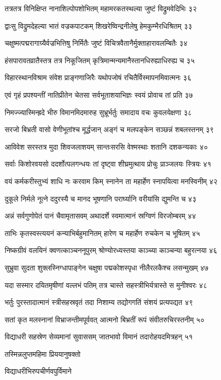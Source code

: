 तत्रतत्र विनिक्षिप्त नानाशिल्पोपशोभितम्
महामरकतस्थल्या जुष्टं विद्रुमवेदिभिः ३२

द्वाःसु विद्रुमदेहल्या भातं वज्रकपाटकम्
शिखरेष्विन्द्रनीलेषु हेमकुम्भैरधिश्रितम् ३३

चक्षुष्मत्पद्मरागाग्र्यैर्वज्रभित्तिषु निर्मितैः
जुष्टं विचित्रवैतानैर्मुक्ताहारावलम्बितैः ३४

हंसपारावतव्रातैस्तत्र तत्र निकूजितम्
कृत्रिमान्मन्यमानैस्तानधिरुह्याधिरुह्य च ३५

विहारस्थानविश्राम संवेश प्राङ्गणाजिरैः
यथोपजोषं रचितैर्विस्मापनमिवात्मनः ३६

एवं गृहं प्रपश्यन्तीं नातिप्रीतेन चेतसा
सर्वभूताशयाभिज्ञः स्वयं प्रोवाच तां प्रति ३७

निमज्ज्यास्मिन्ह्रदे भीरु विमानमिदमारुह
सुभ्रूर्भर्तुः समादाय वचः कुवलयेक्षणा ३८

सरजो बिभ्रती वासो वेणीभूतांश्च मूर्द्धजान्
अङ्गं च मलपङ्केन सञ्छन्नं शबलस्तनम् ३९

आविवेश सरस्तत्र मुदा शिवजलाशयम्
सान्तःसरसि वेश्मस्थाः शतानि दशकन्यकाः ४०

सर्वाः किशोरवयसो ददर्शोत्पलगन्धयः
तां दृष्ट्वा शीघ्रमुत्थाय प्रोचुः प्राञ्जलयः स्त्रियः ४१

वयं कर्मकरीस्तुभ्यं शाधि नः करवाम किम्
स्नानेन ता महार्हेण स्नापयित्वा मनस्विनीम् ४२

दुकूले निर्मले नूत्ने ददुरस्यै च मानद
भूषणानि परार्घ्यानि वरीयांसि द्युमन्ति च ४३

अन्नं सर्वगुणोपेतं पानं चैवामृतासवम्
अथादर्शे स्वमात्मानं स्रग्विणं विरजोम्बरम् ४४

ताभिः कृतस्वस्त्ययनं कन्याभिर्बहुमानितम्
हारेण च महार्हेण रुचकेन च भूषितम् ४५

निष्कग्रीवं वलयिनं क्वणत्काञ्चननूपुरम्
श्रोण्योरध्यस्तया काञ्च्या काञ्चन्या बहुरत्नया ४६

सुभ्रुवा सुदता शुक्लस्निग्धापाङ्गेन चक्षुषा
पद्मकोशस्पृधा नीलैरलकैश्च लसन्मुखम् ४७

यदा सस्मार दयितमृषीणां वल्लभं पतिम्
तत्र चास्ते सहस्त्रीभिर्यत्रास्ते स मुनीश्वरः ४८

भर्तुः पुरस्तादात्मानं स्त्रीसहस्रवृतं तदा
निशाम्य तद्योगगतिं संशयं प्रत्यपद्यत ४९

सतां कृत मलस्नानां विभ्राजन्तीमपूर्ववत्
आत्मनो बिभ्रतीं रूपं संवीतरुचिरस्तनीम् ५०

विद्याधरी सहस्रेण सेव्यमानां सुवाससम्
जातभावो विमानं तदारोहयदमित्रहन् ५१

तस्मिन्नलुप्तमहिमा प्रिययानुषक्तो

विद्याधरीभिरुपचीर्णवपुर्विमाने

